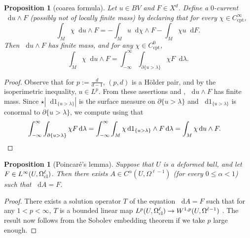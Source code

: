 \documentclass[reqno,11pt]{amsart}
\newcommand*\dif{\mathop{}\!\mathrm{d}}
\newcommand{\cpt}{\mathrm{cpt}}
\newtheorem{proposition}[theorem]{Proposition}
\theoremstyle{definition}
\numberwithin{equation}{section}
\begin{document}
\begin{proposition}[coarea formula]\label{coarea theorem}
Let $u \in BV$ and $F \in X^d$.
Define a $0$-current $\dif u \wedge F$ (possibly not of locally finite mass) by declaring that for every $\chi \in C^\infty_\cpt$,
$$\int_M \chi \dif u \wedge F = -\int_M u \dif \chi \wedge F - \int_M \chi u \dif F.$$
Then $\dif u \wedge F$ has finite mass, and for any $\chi \in C^0_\cpt$,
\begin{equation}\label{coarea formula}
\int_M \chi \dif u \wedge F = \int_{-\infty}^\infty \int_{\partial \{u > \lambda\}} \chi F \dif \lambda.
\end{equation}
\end{proposition}
\begin{proof}
Observe that for $p := \frac{d}{d - 1}$, $(p, d)$ is a H\"older pair, and by the isoperimetric inequality, $u \in L^p$.
From these assertions and \cite[Theorem 1.5]{Anzellotti1983}, $\dif u \wedge F$ has finite mass.
Since $\star|\dif 1_{\{u > \lambda\}}|$ is the surface measure on $\partial \{u > \lambda\}$ and $\dif 1_{\{u > \lambda\}}$ is conormal to $\partial \{u > \lambda\}$, we compute using \cite[Proposition 2.7(ii)]{Anzellotti1983} that
\begin{align*}
\int_{-\infty}^\infty \int_{\partial \{u > \lambda\}} \chi F \dif \lambda = \int_{-\infty}^\infty \int_M \chi \dif 1_{\{u > \lambda\}} \wedge F \dif \lambda &= \int_M \chi \dif u \wedge F. \qedhere 
\end{align*}
\end{proof}

\begin{proposition}[Poincar\'e's lemma]\label{Hodge theorem}
Suppose that $U$ is a deformed ball, and let $F \in L^\infty(U, \Omega^\ell_{\rm cl})$.
Then there exists $A \in C^\alpha(U, \Omega^{\ell - 1})$ (for every $0 \leq \alpha < 1$) such that $\dif A = F$.
\end{proposition}
\begin{proof}
There exists a solution operator $T$ of the equation $\dif A = F$ such that for any $1 < p < \infty$, $T$ is a bounded linear map $L^p(U, \Omega^\ell_{\rm cl}) \to W^{1, p}(U, \Omega^{\ell - 1})$ \cite{Costabel2010}.
The result now follows from the Sobolev embedding theorem if we take $p$ large enough.
\end{proof}


\printbibliography
\end{document}
